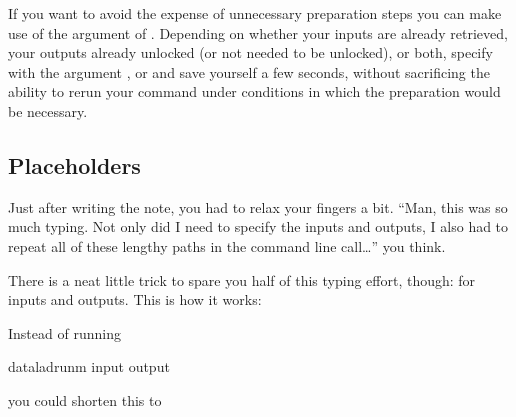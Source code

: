 \sphinxAtStartPar
If you want to avoid the expense of unnecessary preparation steps you can make use of the  argument of .
Depending on whether your inputs are already retrieved, your outputs already unlocked (or not needed to be unlocked), or both, specify  with the argument ,  or  and save yourself a few seconds, without sacrificing the ability to rerun your command under conditions in which the preparation would be necessary.


\subsection{Placeholders}
\label{\detokenize{basics/101-110-run2:placeholders}}
\sphinxAtStartPar
Just after writing the note, you had to relax your fingers a bit. “Man, this was
so much typing. Not only did I need to specify the inputs and outputs, I also had
to repeat all of these lengthy paths in the command line call…” you think.

\sphinxAtStartPar
There is a neat little trick to spare you half of this typing effort, though: 
for inputs and outputs. This is how it works:

\sphinxAtStartPar
Instead of running

\begin{sphinxVerbatim}[commandchars=\\\{\}]
dataladrun\PYGZhy{}m
\PYGZhy{}\PYGZhy{}input
\PYGZhy{}\PYGZhy{}output
\end{sphinxVerbatim}

\sphinxAtStartPar
you could shorten this to

